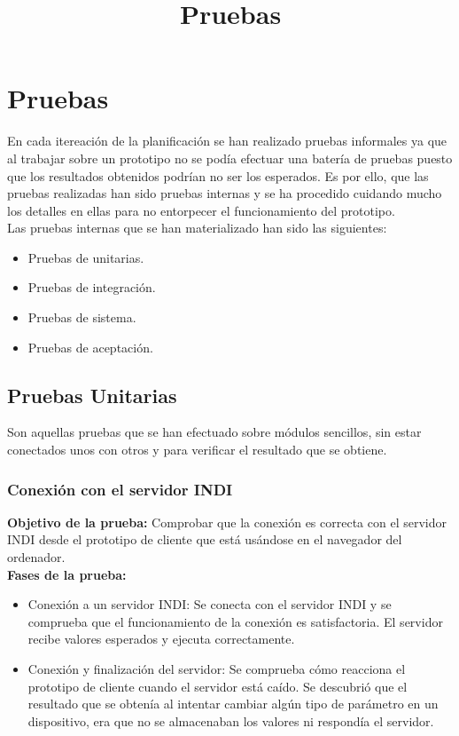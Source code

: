 \chapter{Pruebas}
\title{Pruebas}
\label{cap:Pruebas}

En cada itereación de la planificación se han realizado pruebas informales ya que al trabajar sobre un prototipo no se podía efectuar una batería de pruebas puesto que los resultados obtenidos podrían no ser los esperados. Es por ello, que las pruebas realizadas han sido pruebas internas y se ha procedido cuidando mucho los detalles en ellas para no entorpecer el funcionamiento del prototipo.\\

Las pruebas internas que se han materializado han sido las siguientes:
\begin{itemize}
  \item Pruebas de unitarias.
  \item Pruebas de integración.
  \item Pruebas de sistema.
  \item Pruebas de aceptación.
\end{itemize}

\section{Pruebas Unitarias}
Son aquellas pruebas que se han efectuado sobre módulos sencillos, sin estar conectados unos con otros y para verificar el resultado que se obtiene.

\subsection{Conexión con el servidor INDI}
\textbf{Objetivo de la prueba:} Comprobar que la conexión es correcta con el servidor INDI desde el prototipo de cliente que está usándose en el navegador del ordenador.\\

\textbf{Fases de la prueba:}
\begin{itemize}
  \item Conexión a un servidor INDI: Se conecta con el servidor INDI y se comprueba que el funcionamiento de la conexión es satisfactoria. El servidor recibe valores esperados y ejecuta correctamente.
  \item Conexión y finalización del servidor: Se comprueba cómo reacciona el prototipo de cliente cuando el servidor está caído. Se descubrió que el resultado que se obtenía al intentar cambiar algún tipo de parámetro en un dispositivo, era que no se almacenaban los valores ni respondía el servidor.
\end{itemize}

